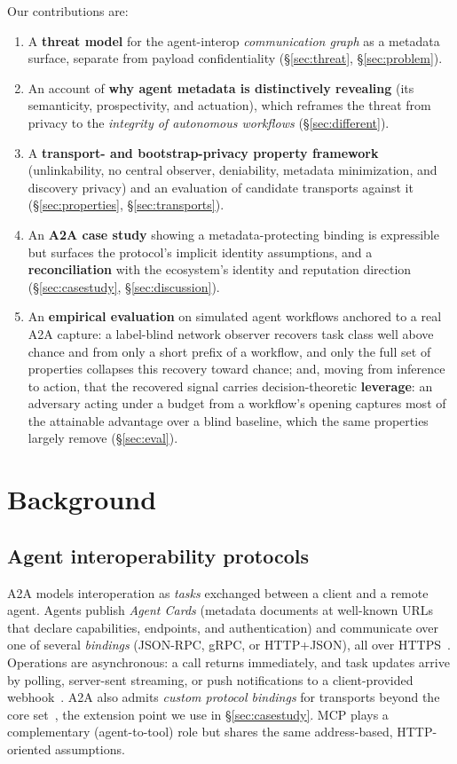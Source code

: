 \documentclass[10pt,twocolumn]{article}
\theoremstyle{definition}
\begin{document}
Our contributions are:
\begin{enumerate}
  \item A \textbf{threat model} for the agent-interop \emph{communication graph} as
  a metadata surface, separate from payload confidentiality
  (\S\ref{sec:threat}, \S\ref{sec:problem}).
  \item An account of \textbf{why agent metadata is distinctively revealing} (its
  semanticity, prospectivity, and actuation), which reframes the threat from privacy
  to the \emph{integrity of autonomous workflows} (\S\ref{sec:different}).
  \item A \textbf{transport- and bootstrap-privacy property framework} (unlinkability,
  no central observer, deniability, metadata minimization, and discovery privacy) and
  an evaluation of candidate transports against it (\S\ref{sec:properties},
  \S\ref{sec:transports}).
  \item An \textbf{A2A case study} showing a metadata-protecting binding is
  expressible but surfaces the protocol's implicit identity assumptions, and a
  \textbf{reconciliation} with the ecosystem's identity and reputation direction
  (\S\ref{sec:casestudy}, \S\ref{sec:discussion}).
  \item An \textbf{empirical evaluation} on simulated agent workflows anchored to a
  real A2A capture: a label-blind network observer recovers task class well above
  chance and from only a short prefix of a workflow, and only the full set of
  properties collapses this recovery toward chance; and, moving from inference to
  action, that the recovered signal carries decision-theoretic \textbf{leverage}: an
  adversary acting under a budget from a workflow's opening captures most of the
  attainable advantage over a blind baseline, which the same properties largely
  remove (\S\ref{sec:eval}).
\end{enumerate}

\section{Background}\label{sec:background}

\subsection{Agent interoperability protocols}
A2A models interoperation as \emph{tasks} exchanged between a client and a remote
agent. Agents publish \emph{Agent Cards} (metadata documents at well-known URLs
that declare capabilities, endpoints, and authentication) and communicate over one
of several \emph{bindings} (JSON-RPC, gRPC, or HTTP+JSON), all over
HTTPS~\citep{a2a}. Operations are asynchronous: a call returns immediately, and task
updates arrive by polling, server-sent streaming, or push notifications to a
client-provided webhook~\citep[\S3.1.7]{a2a}. A2A also admits \emph{custom protocol
bindings} for transports beyond the core set~\citep[\S5]{a2a}, the extension point
we use in \S\ref{sec:casestudy}. MCP plays a complementary
(agent-to-tool) role but shares the same address-based, HTTP-oriented assumptions.
\end{document}
